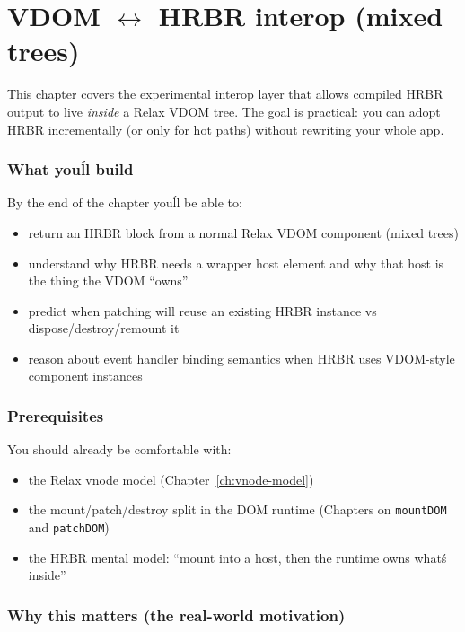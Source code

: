\chapter{VDOM \texorpdfstring{$\leftrightarrow$}{<->} HRBR interop (mixed trees)}
\label{ch:vdom-hrbr-interop}

This chapter covers the experimental interop layer that allows compiled HRBR output to live \emph{inside} a Relax VDOM tree.
The goal is practical: you can adopt HRBR incrementally (or only for hot paths) without rewriting your whole app.

\subsection*{What you\'ll build}

By the end of the chapter you\'ll be able to:

\begin{itemize}
\item return an HRBR block from a normal Relax VDOM component (mixed trees)
\item understand why HRBR needs a wrapper host element and why that host is the thing the VDOM ``owns''
\item predict when patching will reuse an existing HRBR instance vs dispose/destroy/remount it
\item reason about event handler binding semantics when HRBR uses VDOM-style component instances
\end{itemize}

\subsection*{Prerequisites}

You should already be comfortable with:

\begin{itemize}
\item the Relax vnode model (Chapter~\ref{ch:vnode-model})
\item the mount/patch/destroy split in the DOM runtime (Chapters on \texttt{mountDOM} and \texttt{patchDOM})
\item the HRBR mental model: ``mount into a host, then the runtime owns what\'s inside''
\end{itemize}

\subsection*{Why this matters (the real-world motivation)}

